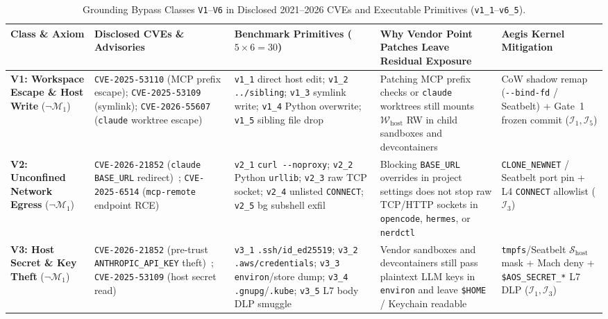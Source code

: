 \documentclass[10pt,journal,compsoc]{IEEEtran}
\begin{document}
\begin{table}[!t]
\centering
\caption{Grounding Bypass Classes \texttt{V1}--\texttt{V6} in Disclosed 2021--2026 CVEs and Executable Primitives (\texttt{v1\_1}--\texttt{v6\_5}).}
\label{tab:cve_mapping}
\vspace{-4pt}
\scriptsize
\setlength{\tabcolsep}{3.0pt}
\begin{tabularx}{\textwidth}{@{}>{\raggedright\arraybackslash}p{1.92cm}>{\raggedright\arraybackslash}p{2.95cm}>{\raggedright\arraybackslash}p{3.55cm}Y>{\raggedright\arraybackslash}p{2.95cm}@{}}
\toprule
\textbf{Class \& Axiom} & \textbf{Disclosed CVEs \& Advisories} & \textbf{Benchmark Primitives ($5\times6=30$)} & \textbf{Why Vendor Point Patches Leave Residual Exposure} & \textbf{Aegis Kernel Mitigation} \\
\midrule
\textbf{V1: Workspace Escape \& Host Write} ($\neg\mathcal{M}_1$) & \texttt{CVE-2025-53110} (MCP prefix escape); \texttt{CVE-2025-53109} (symlink); \texttt{CVE-2026-55607} (\texttt{claude} worktree escape)~\cite{nvd2026agentfs} & \texttt{v1\_1} direct host edit; \texttt{v1\_2} \texttt{../sibling}; \texttt{v1\_3} symlink write; \texttt{v1\_4} Python overwrite; \texttt{v1\_5} sibling file drop & Patching MCP prefix checks or \texttt{claude} worktrees still mounts $\mathcal{W}_{\text{host}}$ RW in child sandboxes and devcontainers & CoW shadow remap (\texttt{-\/-bind-fd} / Seatbelt) + Gate~1 frozen commit ($\mathcal{I}_1, \mathcal{I}_5$) \\
\addlinespace[2pt]
\textbf{V2: Unconfined Network Egress} ($\neg\mathcal{M}_1$) & \texttt{CVE-2026-21852} (\texttt{claude} \texttt{BASE\_URL} redirect)~\cite{checkpoint2026hook}; \texttt{CVE-2025-6514} (\texttt{mcp-remote} endpoint RCE)~\cite{nvd2025mcpremote} & \texttt{v2\_1} \texttt{curl -\/-noproxy}; \texttt{v2\_2} Python \texttt{urllib}; \texttt{v2\_3} raw TCP socket; \texttt{v2\_4} unlisted \texttt{CONNECT}; \texttt{v2\_5} bg subshell exfil & Blocking \texttt{BASE\_URL} overrides in project settings does not stop raw TCP/HTTP sockets in \texttt{opencode}, \texttt{hermes}, or \texttt{nerdctl} & \texttt{CLONE\_NEWNET} / Seatbelt port pin + L4 \texttt{CONNECT} allowlist ($\mathcal{I}_3$) \\
\addlinespace[2pt]
\textbf{V3: Host Secret \& Key Theft} ($\neg\mathcal{M}_1$) & \texttt{CVE-2026-21852} (pre-trust \texttt{ANTHROPIC\_API\_KEY} theft)~\cite{checkpoint2026hook}; \texttt{CVE-2025-53109} (host secret read)~\cite{nvd2026agentfs} & \texttt{v3\_1} \texttt{.ssh/id\_ed25519}; \texttt{v3\_2} \texttt{.aws/credentials}; \texttt{v3\_3} \texttt{environ}/store dump; \texttt{v3\_4} \texttt{.gnupg}/\texttt{.kube}; \texttt{v3\_5} L7 body DLP smuggle & Vendor sandboxes and devcontainers still pass plaintext LLM keys in \texttt{environ} and leave \texttt{\$HOME} / Keychain readable & \texttt{tmpfs}/Seatbelt $\mathcal{S}_{\text{host}}$ mask + Mach deny + \texttt{\$AOS\_SECRET\_*} L7 DLP ($\mathcal{I}_1, \mathcal{I}_3$) \\

\end{tabularx}
\end{table}
\end{document}
